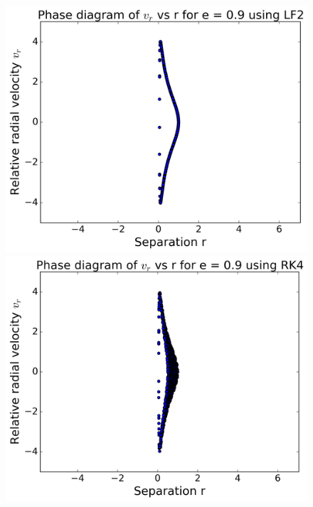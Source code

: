 \begin{figure}[H]
	\centering
	\begin{minipage}[b]{0.48\linewidth}
		\includegraphics[width=\linewidth]{plots_p1/LF2_e09_rv.png}
	\end{minipage}
	\begin{minipage}[b]{0.48\linewidth}
		\includegraphics[width=\linewidth]{plots_p1/RK4_e09_rv.png}
	\end{minipage}
\end{figure}

